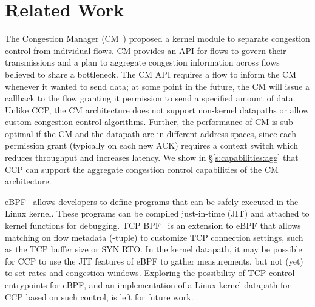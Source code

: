 \section{Related Work}
\label{s:relwork}
The Congestion Manager (CM~\cite{cm}) proposed a kernel module to separate congestion control from individual flows. CM provides an API for flows to govern their transmissions and a plan to aggregate congestion information across flows believed to share a bottleneck. The CM API requires a flow to inform the CM whenever it wanted to send data; at some point in the future, the CM will issue a callback to the flow granting it permission to send a specified amount of data. Unlike CCP, the CM architecture does not support non-kernel datapaths or allow custom congestion control algorithms. Further, the performance of CM is sub-optimal if the CM and the datapath are in different address spaces, since %
each permission grant (typically on each new ACK) requires a context switch which reduces throughput and increases latency. We show in \S\ref{s:capabilities:agg} that CCP can support the aggregate congestion control capabilities of the CM architecture.



eBPF~\cite{ebpf} allows developers to define programs that can be safely executed in the Linux kernel. These programs can be compiled just-in-time (JIT) and attached to kernel functions for debugging. TCP BPF~\cite{tcpbpf} is an extension to eBPF that allows matching on flow metadata (-tuple) to customize TCP connection settings, such as the TCP buffer size or SYN RTO.
In the kernel datapath, it may be possible for CCP to use the JIT features of eBPF to gather measurements, but not (yet) to set rates and congestion windows.
Exploring the possibility of TCP control entrypoints for eBPF, and an implementation of a Linux kernel datapath for CCP based on such control, is left for future work.

